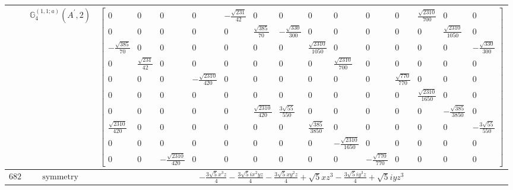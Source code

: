 \documentclass[fleqn,8pt,landscape]{jsarticle}
\begin{document}
\begin{longtable}{ccc}
$  $ & $ \mathbb{G}_{4}^{(1,1;a)}(A^{\prime},2) $ & $ \begin{bmatrix} 0 & 0 & 0 & 0 & - \frac{\sqrt{231}}{42} & 0 & 0 & 0 & 0 & 0 & 0 & \frac{\sqrt{2310}}{700} & 0 & 0 \\ 0 & 0 & 0 & 0 & 0 & \frac{\sqrt{385}}{70} & - \frac{\sqrt{330}}{300} & 0 & 0 & 0 & 0 & 0 & \frac{\sqrt{2310}}{1050} & 0 \\ - \frac{\sqrt{385}}{70} & 0 & 0 & 0 & 0 & 0 & 0 & \frac{\sqrt{2310}}{1050} & 0 & 0 & 0 & 0 & 0 & - \frac{\sqrt{330}}{300} \\ 0 & \frac{\sqrt{231}}{42} & 0 & 0 & 0 & 0 & 0 & 0 & \frac{\sqrt{2310}}{700} & 0 & 0 & 0 & 0 & 0 \\ 0 & 0 & 0 & - \frac{\sqrt{2310}}{420} & 0 & 0 & 0 & 0 & 0 & 0 & \frac{\sqrt{770}}{770} & 0 & 0 & 0 \\ 0 & 0 & 0 & 0 & 0 & 0 & 0 & 0 & 0 & 0 & 0 & \frac{\sqrt{2310}}{1650} & 0 & 0 \\ 0 & 0 & 0 & 0 & 0 & \frac{\sqrt{2310}}{420} & \frac{3 \sqrt{55}}{550} & 0 & 0 & 0 & 0 & 0 & - \frac{\sqrt{385}}{3850} & 0 \\ \frac{\sqrt{2310}}{420} & 0 & 0 & 0 & 0 & 0 & 0 & \frac{\sqrt{385}}{3850} & 0 & 0 & 0 & 0 & 0 & - \frac{3 \sqrt{55}}{550} \\ 0 & 0 & 0 & 0 & 0 & 0 & 0 & 0 & - \frac{\sqrt{2310}}{1650} & 0 & 0 & 0 & 0 & 0 \\ 0 & 0 & - \frac{\sqrt{2310}}{420} & 0 & 0 & 0 & 0 & 0 & 0 & - \frac{\sqrt{770}}{770} & 0 & 0 & 0 & 0 \end{bmatrix} $ \\ \hline
$ 682 $ & $ \text{symmetry} $ & $ - \frac{3 \sqrt{5} x^{3} z}{4} - \frac{3 \sqrt{5} i x^{2} y z}{4} - \frac{3 \sqrt{5} x y^{2} z}{4} + \sqrt{5} x z^{3} - \frac{3 \sqrt{5} i y^{3} z}{4} + \sqrt{5} i y z^{3} $ \\

\end{longtable}
\end{document}

